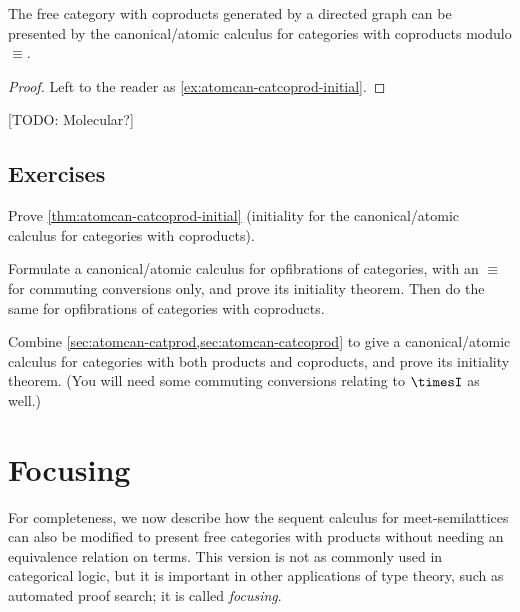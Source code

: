 \begin{thm}\label{thm:atomcan-catcoprod-initial}
  The free category with coproducts generated by a directed graph \cG can be presented by the canonical/atomic calculus for categories with coproducts modulo $\equiv$.
\end{thm}
\begin{proof}
  Left to the reader as \cref{ex:atomcan-catcoprod-initial}.
\end{proof}

[TODO: Molecular?]


\subsection*{Exercises}

\begin{ex}\label{ex:atomcan-catcoprod-initial}
  Prove \cref{thm:atomcan-catcoprod-initial} (initiality for the canonical/atomic calculus for categories with coproducts).
\end{ex}

\begin{ex}\label{ex:atomcan-opfib}
  Formulate a canonical/atomic calculus for opfibrations of categories, with an $\equiv$ for commuting conversions only, and prove its initiality theorem.
  Then do the same for opfibrations of categories with coproducts.
\end{ex}

\begin{ex}\label{ex:atomcan-prodcoprod}
  Combine \cref{sec:atomcan-catprod,sec:atomcan-catcoprod} to give a canonical/atomic calculus for categories with both products and coproducts, and prove its initiality theorem.
  (You will need some commuting conversions relating to $\timesI$ as well.)
\end{ex}


\section{Focusing}
\label{sec:focusing}

For completeness, we now describe how the sequent calculus for meet-semilattices can also be modified to present free categories with products without needing an equivalence relation on terms.
This version is not as commonly used in categorical logic, but it is important in other applications of type theory, such as automated proof search; it is called \emph{focusing}.

